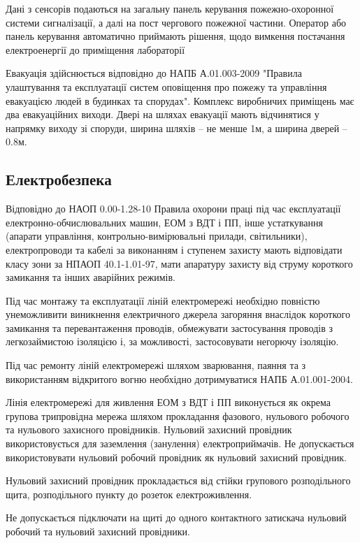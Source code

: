 \documentclass[ukrainian,utf8,simple,floatsubsection, hpadding=5mm,equationsubsection,]{eskdtext}
\begin{document}
Дані з сенсорів подаються на загальну панель керування пожежно-охоронної системи сигналізації, а далі на пост чергового пожежної частини. Оператор або панель керування автоматично приймають рішення, щодо вимкення постачання електроенергії
до приміщення лабораторії

Евакуація здійснюється відповідно до НАПБ А.01.003-2009 "Правила улаштування та експлуатації систем оповіщення про пожежу та управління евакуацією людей в будинках та спорудах". Комплекс виробничих приміщень має два евакуаційних виходи. Двері на шляхах евакуації мають відчинятися у напрямку виходу зі споруди, ширина шляхів -- не менше 1м, а ширина дверей -- 0.8м.

\subsection{Електробезпека}

Відповідно до НАОП 0.00-1.28-10 Правила охорони праці під час експлуатації електронно-обчислювальних машин, ЕОМ з ВДТ і ПП, інше устаткування (апарати управління, контрольно-вимірювальні прилади, світильники), електропроводи та кабелі за виконанням і ступенем захисту мають відповідати класу зони за НПАОП 40.1-1.01-97, мати апаратуру захисту від струму короткого замикання та інших аварійних режимів.

Під час монтажу та експлуатації ліній електромережі необхідно повністю унеможливити виникнення електричного джерела загоряння внаслідок короткого замикання та перевантаження проводів, обмежувати застосування проводів з легкозаймистою ізоляцією і, за можливості, застосовувати негорючу ізоляцію.

Під час ремонту ліній електромережі шляхом зварювання, паяння та з використанням відкритого вогню необхідно дотримуватися НАПБ А.01.001-2004.

Лінія електромережі для живлення ЕОМ з ВДТ і ПП виконується як окрема групова трипровідна мережа шляхом прокладання фазового, нульового робочого та нульового захисного провідників. Нульовий захисний провідник використовується для заземлення (занулення) електроприймачів.
Не допускається використовувати нульовий робочий провідник як нульовий захисний провідник.

Нульовий захисний провідник прокладається від стійки групового розподільного щита, розподільного пункту до розеток електроживлення.

Не допускається підключати на щиті до одного контактного затискача нульовий робочий та нульовий захисний провідники.
\end{document}
